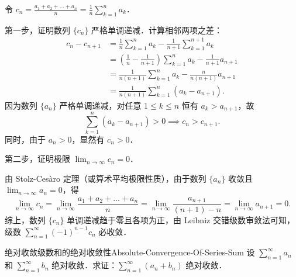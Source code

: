 \begin{myproof}
    令 $c_n = \frac{a_1 + a_2 + \dots + a_n}{n} = \frac{1}{n}\sum_{k=1}^n a_k$．

    第一步，证明数列 $\{c_n\}$ 严格单调递减．计算相邻两项之差：
    \begin{equation}
        \begin{aligned}
            c_n - c_{n+1} & = \frac{1}{n}\sum_{k=1}^n a_k - \frac{1}{n+1}\sum_{k=1}^{n+1} a_k                   \\
                          & = \left( \frac{1}{n} - \frac{1}{n+1} \right)\sum_{k=1}^n a_k - \frac{1}{n+1}a_{n+1} \\
                          & = \frac{1}{n(n+1)}\sum_{k=1}^n a_k - \frac{n}{n(n+1)}a_{n+1}                        \\
                          & = \frac{1}{n(n+1)}\sum_{k=1}^n (a_k - a_{n+1}).
        \end{aligned}
    \end{equation}
    因为数列 $\{a_n\}$ 严格单调递减，对任意 $1 \leqslant k \leqslant n$ 恒有 $a_k > a_{n+1}$，故
    \begin{equation}
        \sum_{k=1}^n (a_k - a_{n+1}) > 0 \implies c_n > c_{n+1}.
    \end{equation}
    同时，由于 $a_n > 0$，显然有 $c_n > 0$．

    第二步，证明极限 $\lim_{n\to\infty} c_n = 0$．

    由 Stolz-Cesàro 定理（或算术平均极限性质），由于数列 $\{a_n\}$ 收敛且 $\lim_{n\to\infty} a_n = 0$，得
    \begin{equation}
        \lim_{n\to\infty} c_n = \lim_{n\to\infty} \frac{a_1 + a_2 + \dots + a_n}{n} = \lim_{n\to\infty} \frac{a_{n+1}}{(n+1) - n} = \lim_{n\to\infty} a_{n+1} = 0.
    \end{equation}
    综上，数列 $\{c_n\}$ 单调递减趋于零且各项为正，由 Leibniz 交错级数审敛法可知，级数 $\sum_{n=1}^\infty (-1)^{n-1} c_n$ 必收敛．
\end{myproof}

\begin{problem}{绝对收敛级数和的绝对收敛性}{Absolute-Convergence-Of-Series-Sum}
    设 $\sum_{n=1}^\infty a_n$ 和 $\sum_{n=1}^\infty b_n$ 绝对收敛．求证：$\sum_{n=1}^\infty (a_n + b_n)$ 绝对收敛．
\end{problem}

